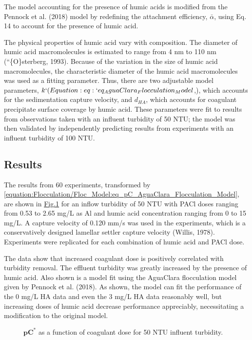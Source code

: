 \documentclass[letterpaper,10pt,english]{sphinxmanual}
\let\sphinxpxdimen\pdfpxdimen\else\newdimen\sphinxpxdimen
\begin{document}
The model accounting for the presence of humic acids is modified from the Pennock et al. (2018) model by redefining the attachment efficiency, \(\bar{\alpha }\), using Eq. 14 to account for the presence of humic acid.

The physical properties of humic acid vary with composition. The diameter of humic acid macromolecules is estimated to range from 4 nm to 110 nm (“\{O\}sterberg, 1993). Because of the variation in the size of humic acid macromolecules, the characteristic diameter of the humic acid macromolecules was used as a fitting parameter. Thus, there are two adjustable model parameters, \(k`(Equation :eq:`eq_AguaClara_Flocculation_Model\),), which accounts for the sedimentation capture velocity, and \(d_{HA}\), which accounts for coagulant precipitate surface coverage by humic acid.  These parameters were fit to results from observations taken with an influent turbidity of 50 NTU; the model was then validated by independently predicting results from experiments with an influent turbidity of 100 NTU.


\subsection{Results}
\label{\detokenize{Flocculation/Floc_Model:id30}}
The results from 60 experiments, transformed by \eqref{equation:Flocculation/Floc_Model:eq_pC_AguaClara_Flocculation_Model}, are shown in \hyperref[\detokenize{Flocculation/Floc_Model:figure-du-fig3}]{Fig.\@ \ref{\detokenize{Flocculation/Floc_Model:figure-du-fig3}}} for an inflow turbidity of 50 NTU with PACl doses ranging from 0.53 to 2.65 mg/L as Al and humic acid concentration ranging from 0 to 15 mg/L. A capture velocity of 0.120 mm/s was used in the experiments, which is a conservatively designed lamellar settler capture velocity (Willis, 1978).  Experiments were replicated for each combination of humic acid and PACl dose.

The data show that increased coagulant dose is positively correlated with turbidity removal. The effluent turbidity was greatly increased by the presence of humic acid.  Also shown is a model fit using the AguaClara flocculation model given by Pennock et al. (2018). As shown, the model can fit the performance of the 0 mg/L HA data and even the 3 mg/L HA data reasonably well, but increasing doses of humic acid decrease performance appreciably, necessitating a modification to the original model.

\begin{figure}[htbp]
\centering
\capstart

\noindent\sphinxincludegraphics[width=400\sphinxpxdimen]{{Du_Fig3}.png}
\caption{\(\boldsymbol{p}{\boldsymbol{C}}^{\boldsymbol{*}}\) as a function of coagulant dose for 50 NTU influent turbidity.}\label{\detokenize{Flocculation/Floc_Model:id45}}\label{\detokenize{Flocculation/Floc_Model:figure-du-fig3}}\end{figure}
\end{document}
